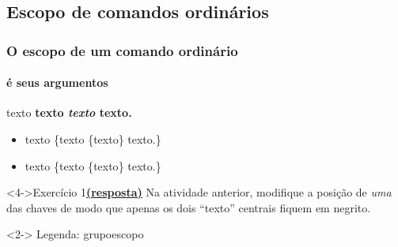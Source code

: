 \documentclass[handout,10pt]{beamer}
\newcommand{\grupo}[1]{\colorbox{red!50}{#1}}
\newcommand{\escopo}[1]{\colorbox{yellow!50}{#1}}
\begin{document}
\subsection{Escopo de comandos ordinários}
\setlength{\fboxrule}{1pt}
\begin{frame}[fragile]
	\frametitle{O escopo de um comando ordinário}
	\framesubtitle{é seus argumentos}
		
	\begin{atividade}{2}
		\begin{LaTeXcode}
			texto \textbf{texto \textit{texto} texto.}
		\end{LaTeXcode}
	\end{atividade}\vfill
	
	\begin{itemize}
	\item<2-> texto \{\grupo{\escopo{texto \{texto\} texto.}}\}
	\item<3-> texto \{texto \{\grupo{\escopo{texto}}\} texto.\}
	\end{itemize}\vfill
	
	\begin{block}<4->{Exercício 1\hfill \hyperlink{respostas}{\footnotesize\textbf{(resposta)}}}
		Na atividade anterior, modifique a posição de \emph{uma} das chaves de modo que
		apenas os dois ``texto'' centrais fiquem em negrito.
	\end{block}\vfill
	
	\begin{uncoverenv}<2->
		\footnotesize
		Legenda: \grupo{grupo}\quad\escopo{escopo}
	\end{uncoverenv}
	
\end{frame}
\end{document}
